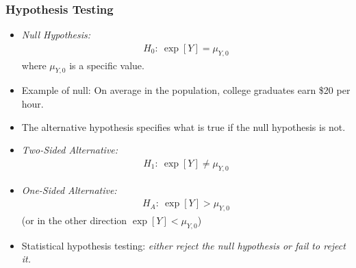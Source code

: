 

\begin{frame}
\frametitle{Hypothesis Testing}
\begin{itemize}
\item \emph{Null Hypothesis:} 
\begin{align*}
H_0{:}~\exp[Y] = \mu_{Y,0} 
\end{align*}
where $\mu_{Y,0}$ is a specific value. 
\item Example of null: On average in the population, college graduates earn \$20 per hour.
\item The alternative hypothesis specifies what is true if the null hypothesis is not.
\item \emph{Two-Sided Alternative:}
\begin{align*}
H_1{:}~\exp[Y] \ne \mu_{Y,0} 
\end{align*}
\item \emph{One-Sided Alternative:}
\begin{align*}
H_A{:}~\exp[Y] > \mu_{Y,0} 
\end{align*}
(or in the other direction $\exp[Y]<\mu_{Y,0}$)
\item Statistical hypothesis testing: \textit{either reject the null hypothesis or fail to reject it.}
\end{itemize}
\end{frame}



